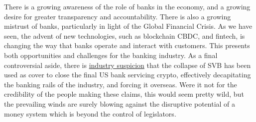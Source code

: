 There is a growing awareness of the role of banks in the economy, and a growing desire for greater transparency and accountability. There is also a growing mistrust of banks, particularly in light of the Global Financial Crisis. As we have seen, the advent of new technologies, such as blockchain CBDC, and fintech, is changing the way that banks operate and interact with customers. This presents both opportunities and challenges for the banking industry. As a final controversial aside, there is \href{https://apnews.com/article/signature-bank-fdic-barney-frank-silicon-valley-6ad86262d9945675a42d735b66ace4f2}{industry suspicion} that the collapse of SVB has been used as cover to close the final US bank servicing crypto, effectively decapitating the banking rails of the industry, and forcing it overseas. Were it not for the credibility of the people making these claims, this would seem pretty wild, but the prevailing winds are surely blowing against the disruptive potential of a money system which is beyond the control of legislators.
